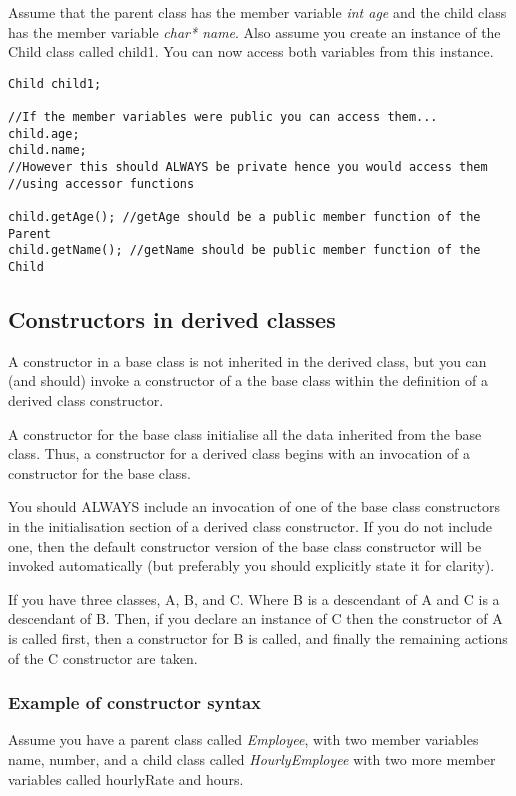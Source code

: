 Assume that the parent class has the member variable \emph{int age} and the child
class has the member variable \emph{char* name}. Also assume you create an
instance of the Child class called child1. You can now access both variables from
this instance.

\begin{verbatim}
Child child1;

//If the member variables were public you can access them...
child.age;
child.name;
//However this should ALWAYS be private hence you would access them
//using accessor functions

child.getAge(); //getAge should be a public member function of the Parent
child.getName(); //getName should be public member function of the Child
\end{verbatim}





\subsection{Constructors in derived classes}
A constructor in a base class is not inherited in the derived class, but you can (and
should) invoke a constructor of a the base class within the definition of a derived class
constructor.

A constructor for the base class initialise all the data inherited from the base class.
Thus, a constructor for a derived class begins with an invocation of a constructor
for the base class.

You should ALWAYS include an invocation of one of the base class constructors
in the initialisation section of a derived class constructor. If you do not include one,
then the default constructor version of the base class constructor will be invoked
automatically (but preferably you should explicitly state it for clarity).

If you have three classes, A, B, and C. Where B is a descendant of A and C is a 
descendant of B. Then, if you declare an instance of C then the constructor of A
is called first, then a constructor for B is called, and finally the remaining actions
of the C constructor are taken.


\subsubsection*{Example of constructor syntax}
Assume you have a parent class called \emph{Employee}, with two member variables
name, number, and a child class called \emph{HourlyEmployee} with two more member
variables called hourlyRate and hours.

